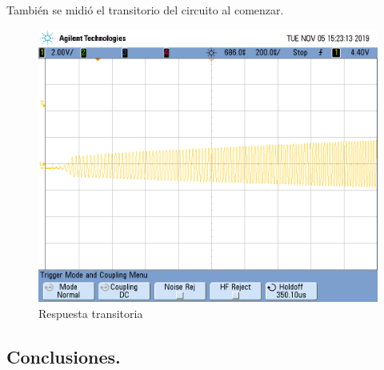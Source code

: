 También se midió el transitorio del circuito al comenzar.
\begin{figure}[H]
	\centering
	\includegraphics[width=\textwidth]{Imagenes-Ej1/osciladorstep.png}
	\caption{Respuesta transitoria}
	\label{fig:trans}
\end{figure}

\subsection{Conclusiones.}
